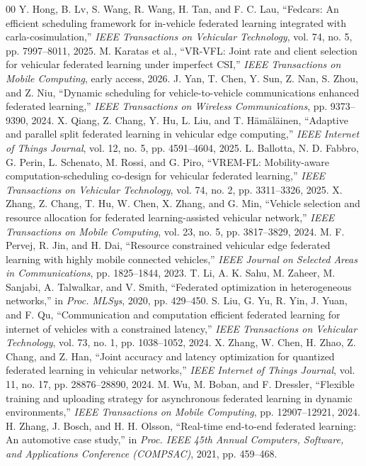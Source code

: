 \documentclass[conference]{IEEEtran}
\begin{document}
\begin{thebibliography}{00}
 Y. Hong, B. Lv, S. Wang, R. Wang, H. Tan, and F. C. Lau, ``Fedcars: An efficient scheduling framework for in-vehicle federated learning integrated with carla-cosimulation,'' \textit{IEEE Transactions on Vehicular Technology}, vol. 74, no. 5, pp. 7997--8011, 2025.
 M. Karatas et al., ``VR-VFL: Joint rate and client selection for vehicular federated learning under imperfect CSI,'' \textit{IEEE Transactions on Mobile Computing}, early access, 2026.
 J. Yan, T. Chen, Y. Sun, Z. Nan, S. Zhou, and Z. Niu, ``Dynamic scheduling for vehicle-to-vehicle communications enhanced federated learning,'' \textit{IEEE Transactions on Wireless Communications}, pp. 9373--9390, 2024.
 X. Qiang, Z. Chang, Y. Hu, L. Liu, and T. H{\"a}m{\"a}l{\"a}inen, ``Adaptive and parallel split federated learning in vehicular edge computing,'' \textit{IEEE Internet of Things Journal}, vol. 12, no. 5, pp. 4591--4604, 2025.
 L. Ballotta, N. D. Fabbro, G. Perin, L. Schenato, M. Rossi, and G. Piro, ``VREM-FL: Mobility-aware computation-scheduling co-design for vehicular federated learning,'' \textit{IEEE Transactions on Vehicular Technology}, vol. 74, no. 2, pp. 3311--3326, 2025.
 X. Zhang, Z. Chang, T. Hu, W. Chen, X. Zhang, and G. Min, ``Vehicle selection and resource allocation for federated learning-assisted vehicular network,'' \textit{IEEE Transactions on Mobile Computing}, vol. 23, no. 5, pp. 3817--3829, 2024.
 M. F. Pervej, R. Jin, and H. Dai, ``Resource constrained vehicular edge federated learning with highly mobile connected vehicles,'' \textit{IEEE Journal on Selected Areas in Communications}, pp. 1825--1844, 2023.
 T. Li, A. K. Sahu, M. Zaheer, M. Sanjabi, A. Talwalkar, and V. Smith, ``Federated optimization in heterogeneous networks,'' in \textit{Proc. MLSys}, 2020, pp. 429--450.
 S. Liu, G. Yu, R. Yin, J. Yuan, and F. Qu, ``Communication and computation efficient federated learning for internet of vehicles with a constrained latency,'' \textit{IEEE Transactions on Vehicular Technology}, vol. 73, no. 1, pp. 1038--1052, 2024.
 X. Zhang, W. Chen, H. Zhao, Z. Chang, and Z. Han, ``Joint accuracy and latency optimization for quantized federated learning in vehicular networks,'' \textit{IEEE Internet of Things Journal}, vol. 11, no. 17, pp. 28876--28890, 2024.
 M. Wu, M. Boban, and F. Dressler, ``Flexible training and uploading strategy for asynchronous federated learning in dynamic environments,'' \textit{IEEE Transactions on Mobile Computing}, pp. 12907--12921, 2024.
 H. Zhang, J. Bosch, and H. H. Olsson, ``Real-time end-to-end federated learning: An automotive case study,'' in \textit{Proc. IEEE 45th Annual Computers, Software, and Applications Conference (COMPSAC)}, 2021, pp. 459--468.
\end{thebibliography}
\end{document}

